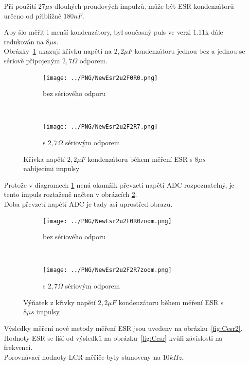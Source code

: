 Při použití \(27\mu s\) dlouhých proudových impulzů, může být ESR kondenzátorů určeno od přibližně \(180nF\).

Aby šlo měřit i menší kondenzátory, byl současný puls ve verzi 1.11k dále redukován na \(8\mu s\).\\

Obrázky~\ref{pic:NewEsr2} ukazují křivku napětí na \(2,2\mu F\) kondenzátoru jednou bez a jednou se sériově připojeným \(2,7\Omega\) odporem.

\begin{figure}[H]
  \begin{subfigure}[b]{9cm}
    \centering
    \texttt{[image: ../PNG/NewEsr2u2F0R0.png]}
    \caption{bez sériového odporu}
  \end{subfigure}
  ~
  \begin{subfigure}[b]{9cm}
    \centering
    \texttt{[image: ../PNG/NewEsr2u2F2R7.png]}
    \caption{s \(2,7\Omega\) sériovým odporem}
  \end{subfigure}
  \caption{Křivka napětí \(2,2\mu F\) kondenzátoru během měření ESR s \(8\mu s\) nabíjecími impulsy}
  \label{pic:NewEsr2}
\end{figure}

Protože v diagramech \ref{pic:NewEsr2} nená okamžik převzetí napětí ADC rozpoznatelný,
je tento impuls roztaženě načten v obrázcích \ref{pic:NewEsr2zoom}.\\ Doba převzetí napětí
ADC je tady asi uprostřed obrazu.

\begin{figure}[H]
  \begin{subfigure}[b]{9cm}
    \centering
    \texttt{[image: ../PNG/NewEsr2u2F0R0zoom.png]}
    \caption{bez sériového odporu}
  \end{subfigure}
  ~
  \begin{subfigure}[b]{9cm}
    \centering
    \texttt{[image: ../PNG/NewEsr2u2F2R7zoom.png]}
    \caption{s \(2,7\Omega\) sériovým odporem}
  \end{subfigure}
  \caption{Výňatek z křivky napětí \(2,2\mu F\) kondenzátoru během měření ESR s \(8\mu s\) impulsy}
  \label{pic:NewEsr2zoom}
\end{figure}
 

Výsledky měření nové metody měření ESR jsou uvedeny na obrázku~\ref{fig:Cesr2}.\\
Hodnoty ESR se liší od výsledků na obrázku~\ref{fig:Cesr} kvůli závislosti na frekvenci.\\
Porovnávací hodnoty  LCR-měřiče byly stanoveny na \(10kHz\).


